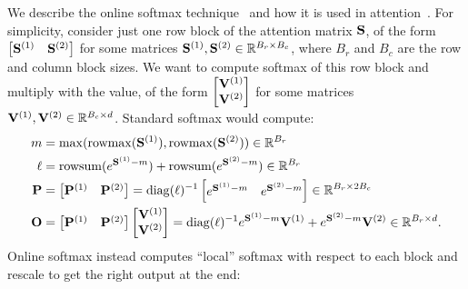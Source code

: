 We describe the online softmax technique~\citep{milakov2018online} and how it is
used in attention~\citep{rabe2021self}.
For simplicity, consider just one row block of the attention matrix $\mathbf{S}$, of the form
$\begin{bmatrix} \mathbf{S}^{(1)} & \mathbf{S}^{(2)} \end{bmatrix}$ for some matrices
$\mathbf{S}^{(1)}, \mathbf{S}^{(2)} \in \mathbb{R}^{B_r \times B_c}$, where $B_r$ and $B_c$ are the row and
column block sizes.
We want to compute softmax of this row block and multiply with the value,
of the form $\begin{bmatrix} \mathbf{V}^{(1)} \\ \mathbf{V}^{(2)} \end{bmatrix}$ for some
matrices $\mathbf{V}^{(1)}, \mathbf{V}^{(2)} \in \mathbb{R}^{B_c \times d}$.
Standard softmax would compute:
\begin{align*}
  m &= \max(\mathrm{rowmax}(\mathbf{S}^{(1)}), \mathrm{rowmax}(\mathbf{S}^{(2)})) \in \mathbb{R}^{B_r}  \\
  \ell &= \mathrm{rowsum}(e^{\mathbf{S}^{(1)} - m}) + \mathrm{rowsum}(e^{\mathbf{S}^{(2)} - m}) \in \mathbb{R}^{B_r}  \\
  \mathbf{P} &= \begin{bmatrix} \mathbf{P}^{(1)} & \mathbf{P}^{(2)} \end{bmatrix} = \mathrm{diag}(\ell)^{-1}\begin{bmatrix} e^{\mathbf{S}^{(1)} - m} & e^{\mathbf{S}^{(2)} - m} \end{bmatrix} \in \mathbb{R}^{B_r \times 2B_c} \\
  \mathbf{O} &= \begin{bmatrix} \mathbf{P}^{(1)} & \mathbf{P}^{(2)} \end{bmatrix} \begin{bmatrix} \mathbf{V}^{(1)} \\ \mathbf{V}^{(2)} \end{bmatrix} = \mathrm{diag}(\ell)^{-1} e^{\mathbf{S}^{(1)} - m} \mathbf{V}^{(1)} + e^{\mathbf{S}^{(2)} - m} \mathbf{V}^{(2)} \in \mathbb{R}^{B_r \times d}.
\end{align*}
Online softmax instead computes ``local'' softmax with respect to each block and
rescale to get the right output at the end:
